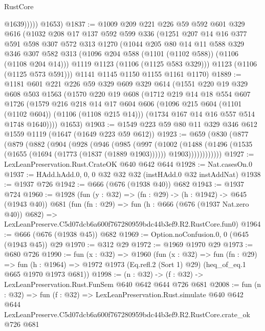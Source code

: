 \begin{lexlean}{RustCore}
\begin{coremodule}
                @1639)))))
      @1653)
@1837 := @1009
    @209
    @221
    @226
    @59
    @592
    @601
    @329
    @616
    (@1032
      @208
      @17
      @137
      @592
      @599
      @336
      (@1251
        @207
        @14
        @16
        @377
        @591
        @598
        @307
        @572
        @313
        @1270
        (@1044
          @205
          @80
          @14
          @11
          @588
          @329
          @346
          @307
          @582
          @313
          (@1096 @204 @588 (@1101 (@1102 @588)) (@1106 (@1108 @204 @14)))
          @1119
          @1123
          (@1106 (@1125 @583 @329)))
        @1123
        (@1106 (@1125 @573 @591)))
      @1141
      @1145
      @1150
      @1155
      @1161
      @1170)
@1889 := @1181
    @601
    @221
    @226
    @59
    @329
    @609
    @329
    @614
    (@1551
      @220
      @19
      @329
      @608
      @503
      @1563
      (@1570
        @220
        @19
        @608
        (@1712
          @219
          @14
          @18
          @554
          @607
          @1726
          (@1579
            @216
            @218
            @14
            @17
            @604
            @606
            (@1096 @215 @604 (@1101 (@1102 @604)) (@1106 (@1108 @215 @14)))
            (@1734 @167 @14 @16 @557 @514 @1748 @1640))))
      @1653)
@1903 := @1549 @223 @59 @80 @11 @329 @346 @612 @1559 @1119 (@1647 (@1649 @223 @59 @612))
@1923 := @659
    (@830
      (@877
        (@879
          (@882
            (@904
              (@928
                (@946
                  (@985
                    (@997
                      (@1002
                        (@1488
                          (@1496
                            (@1535 (@1655 (@1694 (@1773 (@1837 (@1889 @1903))))))
                            @1903))))))))))))
@1927 := LexLeanPreservation.Rust.CrateOK @640 @642 @644
@1928 := Nat.casesOn.{0}
@1937 := HAdd.hAdd.{0, 0, 0} @32 @32 @32 (instHAdd.{0} @32 instAddNat)
@1938 := @1937 @726
@1942 := @666 (@676 (@1938 @40)) @682
@1943 := @1937 @724
@1960 := @1928
    (fun (y : @32) => (fn : @29) -> (h : @1942) -> @645 (@1943 @40))
    @681
    (fun (fn : @29) =>
    fun (h : @666 (@676 (@1937 Nat.zero @40)) @682) =>
    LexLeanPreserve.C5d07dcb6a600f767280959bdc44b3ef9.R2.RustCore.fun0)
@1964 := @666 (@676 (@1938 @45)) @682
@1969 := Option.noConfusion.{0, 0} (@645 (@1943 @45)) @29
@1970 := @312 @29
@1972 := @1969 @1970 @29
@1973 := @680 @726
@1990 := fun (x : @32) =>
  @1960
    (fun (x : @32) =>
    fun (fn : @29) =>
    fun (h : @1964) => @1972 @1973 (Eq.refl.{2} (Sort 1) @29) (heq_of_eq.{1} @665 @1970 @1973 @681))
@1998 := (n : @32) -> (f : @32) -> LexLeanPreservation.Rust.FunSem @640 @642 @644 @726 @681
@2008 := fun (n : @32) =>
  fun (f : @32) =>
  LexLeanPreservation.Rust.simulate
    @640
    @642
    @644
    LexLeanPreserve.C5d07dcb6a600f767280959bdc44b3ef9.R2.RustCore.crate_ok
    @726
    @681
\end{coremodule}
\end{lexlean}
